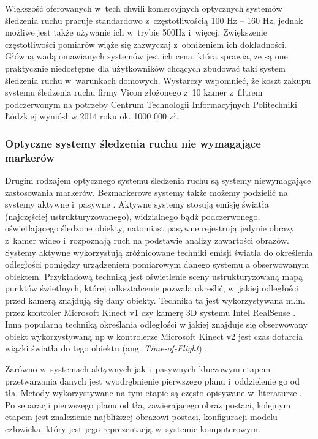 Większość oferowanych w~tech chwili komercyjnych optycznych systemów śledzenia ruchu pracuje standardowo z~częstotliwością 100 Hz -- 160 Hz, jednak możliwe jest także używanie ich w~trybie 500Hz i~więcej. Zwiększenie częstotliwości pomiarów wiąże się zazwyczaj z~obniżeniem ich dokładności.
Główną wadą omawianych systemów jest ich cena, która sprawia, że są one praktycznie niedostępne dla użytkowników chcących zbudować taki system śledzenia ruchu w~warunkach domowych. Wystarczy wspomnieć, że koszt zakupu systemu śledzenia ruchu firmy Vicon złożonego z~10 kamer z~filtrem podczerwonym na potrzeby Centrum Technologii Informacyjnych Politechniki Łódzkiej  wyniósł w 2014 roku ok. 1000 000 zł.

\subsubsection*{Optyczne systemy śledzenia ruchu nie wymagające markerów}\label{chap:mocaps:Kinect}
Drugim rodzajem optycznego systemu śledzenia ruchu są systemy niewymagające zastosowania markerów. Bezmarkerowe systemy także możemy podzielić na systemy aktywne i~pasywne \cite{Mundermann2006}. Aktywne systemy stosują emisję światła (najczęściej ustrukturyzowanego), widzialnego bądź podczerwonego, oświetlającego śledzone obiekty, natomiast pasywne rejestrują jedynie obrazy z~kamer wideo i~rozpoznają ruch na podstawie analizy zawartości obrazów. \\
Systemy aktywne wykorzystują zróżnicowane techniki emisji światła do określenia odległości pomiędzy urządzeniem pomiarowym danego systemu a obserwowanym obiektem. Przykładową techniką jest oświetlenie sceny ustrukturyzowaną mapą punktów świetlnych, której odkształcenie pozwala określić, w~jakiej odległości przed kamerą znajdują się dany obiekty. Technika ta jest wykorzystywana m.in. przez kontroler Microsoft Kinect v1 \cite{flatley2011} czy kamerę 3D systemu Intel RealSense \cite{intelRealSenseWebsite}. Inną popularną techniką określania odległości w jakiej znajduje się obserwowany obiekt wykorzystywaną np w kontrolerze Microsoft Kinect v2 \cite{kinect2Spec} jest czas dotarcia wiązki światła do tego obiektu (ang. \emph{Time-of-Flight}) \cite{Hansard2013}.

Zarówno w~systemach aktywnych jak i~pasywnych kluczowym etapem przetwarzania danych jest wyodrębnienie pierwszego planu i~oddzielenie go od tła. Metody wykorzystywane na tym etapie są często opisywane w~literaturze \cite{wang2003recent}\cite{rosenhahn2008markerless}\cite{guan2009estimating}\cite{surer2011markerless}\cite{corazza2006markerless}. Po separacji pierwszego planu od tła, zawierającego obraz postaci, kolejnym etapem jest znalezienie najbliższej obrazowi postaci, konfiguracji modelu człowieka, który jest jego reprezentacją w~systemie komputerowym.\\ 


